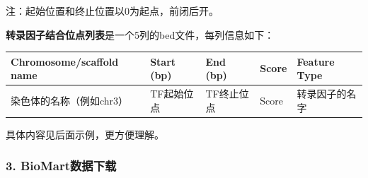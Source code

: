 \documentclass[]{article}
\numberwithin{figure}{section}
\numberwithin{table}{section}
\begin{document}
注：起始位置和终止位置以0为起点，前闭后开。

\textbf{转录因子结合位点列表}是一个5列的bed文件，每列信息如下：

\begin{longtable}[]{@{}lllll@{}}
\toprule
Chromosome/scaffold name & Start (bp) & End (bp) & Score & Feature Type\tabularnewline
\midrule
\endhead
染色体的名称（例如chr3） & TF起始位点 & TF终止位点 & Score & 转录因子的名字\tabularnewline
\bottomrule
\end{longtable}

具体内容见后面示例，更方便理解。

\hypertarget{biomart_motif_3}{%
\subsubsection{3. BioMart数据下载}\label{biomart_motif_3}}
\end{document}
